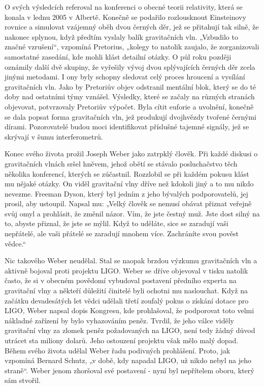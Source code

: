   O svých výsledcích referoval na konferenci o obecné teorii relativity, která se konala v lednu
  2005 v Albertě. Konečně se podařilo rozlousknout Einsteinovy rovnice a simulovat vzájemný oběh
  dvou černých děr, jež se přitahují tak silně, že nakonec splynou, když předtím vyslaly balík
  gravitačních vln. „Vzbudilo to značné vzrušení“, vzpomíná Pretorius, „kolegy to natolik zaujalo,
  že zorganizovali samostatné zasedání, kde mohli klást detailní otázky. O půl roku později oznámily
  další dvě skupiny, že vyřešily vývoj dvou splývajících černých děr zcela jinými metodami. I ony
  byly schopny sledovat celý proces hroucení a vysílání gravitačních vln. Jako by Pretoriův objev
  odstranil mentální blok, který se do té doby nad ostatními týmy vznášel. Výsledky, které se začaly
  na různých stranách objevovat, potvrzovaly Pretoriův výpočet. Byla cítit euforie a uvolnění,
  konečně se dala popsat forma gravitačních vln, jež produkují dvojhvězdy tvořené černými dírami.
  Pozorovatelé budou moci identifikovat příslušné tajemné signály, jež se skrývají v šumu
  interferometrů. 

  Konec svého života prožil Joseph Weber jako zatrpklý člověk. Při každé diskusi o gravitačních
  vlnách sršel hněvem, jehož obětí se stávalo posluchačstvo těch několika konferencí, kterých se
  zúčastnil. Rozzlobil se při každém pokusu klást mu nějaké otázky. On viděl gravitační vlny dříve
  než kdokoli jiný a to mu nikdo nevezme. Freeman Dyson, který byl jedním z jeho bývalých
  podporovatelů, jej prosil, aby ustoupil. Napsal mu: „Velký člověk se nemusí obávat přiznat veřejně
  svůj omyl a prohlásit, že změnil názor. Vím, že jste čestný muž. Jste dost silný na to, abyste
  přiznal, že jste se mýlil. Když to uděláte, sice se zaradují vaši nepřátelé, ale vaši přátelé se
  zaradují mnohem více. Zachráníte svou pověst vědce.“ 
  
  Nic takového Weber neudělal. Stal se naopak brzdou výzkumu gravitačních vln a aktivně bojoval
  proti projektu LIGO. Weber se dříve objevoval v tisku natolik často, že si v obecném povědomí
  vybudoval postavení předního experta na gravitační vlny a někteří důležití činitelé byli ochotni
  mu naslouchat. Když na začátku devadesátých let vědci udělali třetí zoufalý pokus o získání dotace
  pro LIGO, Weber napsal dopis Kongresu, kde prohlašoval, že podporovat toto velmi nákladné zařízení
  by bylo vyhazováním peněz. Tvrdil, že jeho válce viděly gravitační vlny za zlomek peněz
  požadovaných na LIGO, není tedy žádný důvod utrácet sta miliony dolarů. Jeho ostouzení projektu
  však mělo malý dopad. Během svého života udělal Weber řadu podivných prohlášení. Proto, jak
  vzpomíná Bernard Schutz, „v době, kdy napadal LIGO, už nikdo nebyl na jeho straně“. Weber jenom
  zhoršoval své postavení - nyní byl nepřítelem oboru, který sám stvořil. 
  
